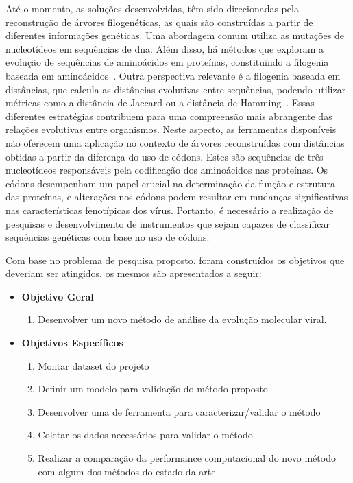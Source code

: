 Até o momento, as soluções desenvolvidas, têm sido direcionadas pela reconstrução de árvores filogenéticas, as quais são construídas a partir de diferentes informações genéticas. Uma abordagem comum utiliza as mutações de nucleotídeos em sequências de \gls{dna}. Além disso, há métodos que exploram a evolução de sequências de aminoácidos em proteínas, constituindo a filogenia baseada em aminoácidos~\cite{protein_le_2008}. Outra perspectiva relevante é a filogenia baseada em distâncias, que calcula as distâncias evolutivas entre sequências, podendo utilizar métricas como a distância de Jaccard ou a distância de Hamming~\cite{sokal_statistical_method_1958}. Essas diferentes estratégias contribuem para uma compreensão mais abrangente das relações evolutivas entre organismos. Neste aspecto, as ferramentas disponíveis não oferecem uma aplicação no contexto de árvores reconstruídas com distâncias obtidas a partir da diferença do uso de códons. Estes são sequências de três nucleotídeos responsáveis pela codificação dos aminoácidos nas proteínas. Os códons desempenham um papel crucial na determinação da função e estrutura das proteínas, e alterações nos códons podem resultar em mudanças significativas nas características fenotípicas dos vírus. Portanto, é necessário a realização de pesquisas e desenvolvimento de instrumentos que sejam capazes de classificar sequências genéticas com base no uso de códons.

Com base no problema de pesquisa proposto, foram construídos os objetivos que deveriam ser atingidos, os mesmos são apresentados a seguir:
\begin{itemize}
      \item \textbf{Objetivo Geral}
            \begin{enumerate}[label=~(\roman*)]
                  \item Desenvolver um novo método de análise da evolução molecular viral.
            \end{enumerate}
      \item \textbf{Objetivos Específicos}
            \begin{enumerate}[label=~(\roman*)]
                  \item Montar dataset do projeto
                  \item Definir um modelo para validação do método proposto
                  \item Desenvolver uma de ferramenta para caracterizar/validar o método
                  \item Coletar os dados necessários para validar o método
                  \item Realizar a comparação da performance computacional do novo método com algum dos métodos do estado da arte.
            \end{enumerate}
\end{itemize}

